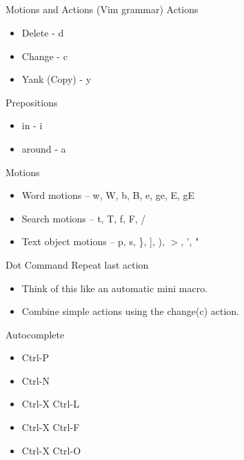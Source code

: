 \documentclass{beamer}
\begin{document}
    \subsection{}
    \begin{frame}{Motions and Actions (Vim grammar)}
        Actions
        \begin{itemize}
            \item Delete - d
            \item Change - c
            \item Yank (Copy) - y
        \end{itemize}
        Prepositions
        \begin{itemize}
            \item in - i
            \item around - a
        \end{itemize}
        Motions
        \begin{itemize}
            \item Word motions -- w, W, b, B, e, ge, E, gE
            \item Search motions -- t, T, f, F, /
            \item Text object motions -- p, s, \}, ], ), $>$, ', "
        \end{itemize}
    \end{frame}
    \begin{frame}{Dot Command}
        Repeat last action
        \begin{itemize}
            \item Think of this like an automatic mini macro.
            \item Combine simple actions using the change(c) action.
        \end{itemize}
    \end{frame}
    \begin{frame}{Autocomplete}
        \begin{itemize}
            \item Ctrl-P
            \item Ctrl-N
            \item Ctrl-X Ctrl-L
            \item Ctrl-X Ctrl-F
            \item Ctrl-X Ctrl-O
        \end{itemize}
    \end{frame}
\end{document}
